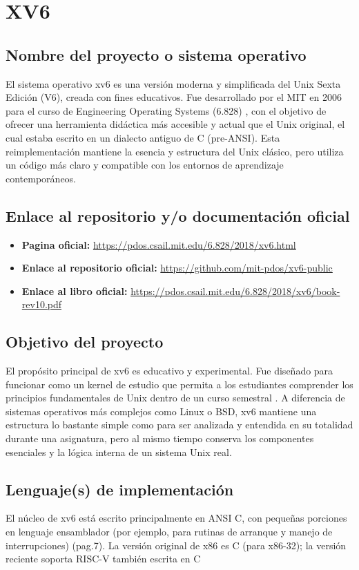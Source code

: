 \section{XV6}

\subsection{Nombre del proyecto o sistema operativo}
El sistema operativo xv6 es una versión moderna y simplificada del Unix Sexta Edición (V6), creada con fines educativos. Fue desarrollado por el MIT en 2006 para el curso de Engineering Operating Systems (6.828) \citep{xv6_mit}, con el objetivo de ofrecer una herramienta didáctica más accesible y actual que el Unix original, el cual estaba escrito en un dialecto antiguo de C (pre-ANSI). Esta reimplementación mantiene la esencia y estructura del Unix clásico, pero utiliza un código más claro y compatible con los entornos de aprendizaje contemporáneos.
\subsection{Enlace al repositorio y/o documentación oficial}
\begin{itemize}
    \item \textbf{Pagina oficial:} \url{https://pdos.csail.mit.edu/6.828/2018/xv6.html}
    \item \textbf{Enlace al repositorio oficial:}  \url {https://github.com/mit-pdos/xv6-public}
    \item \textbf{Enlace al libro oficial:}  \url {https://pdos.csail.mit.edu/6.828/2018/xv6/book-rev10.pdf}
\end{itemize}

\subsection{Objetivo del proyecto}
El propósito principal de xv6 es educativo y experimental. Fue diseñado para funcionar como un kernel de estudio que permita a los estudiantes comprender los principios fundamentales de Unix dentro de un curso semestral \citep{wikipedia-xv6}. A diferencia de sistemas operativos más complejos como Linux o BSD, xv6 mantiene una estructura lo bastante simple como para ser analizada y entendida en su totalidad durante una asignatura, pero al mismo tiempo conserva los componentes esenciales y la lógica interna de un sistema Unix real. 

\subsection{Lenguaje(s) de implementación}
El núcleo de xv6 está escrito principalmente en ANSI C, con pequeñas porciones en lenguaje ensamblador (por ejemplo, para rutinas de arranque y manejo de interrupciones)\citep{xv6_mit} (pag.7). La versión original de x86 es C (para x86-32); la versión reciente soporta RISC-V también escrita en C 

